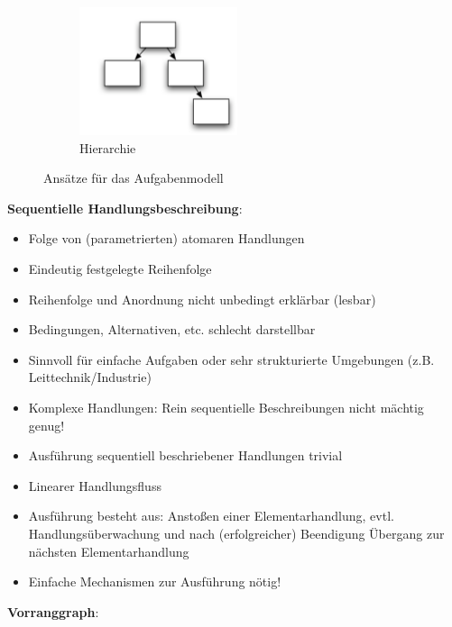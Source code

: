 \begin{figure}[h!]
\begin{subfigure}{.25\textwidth}
		\includegraphics[width=\textwidth]{figures/ch02_ans2.png}
		\caption{Hierarchie}
		\label{hier}
	\end{subfigure}
	\caption{Ansätze für das Aufgabenmodell}
	\label{ans}
\end{figure}
\textbf{Sequentielle Handlungsbeschreibung}:
\begin{itemize}
\item Folge von (parametrierten) atomaren Handlungen
\item Eindeutig festgelegte Reihenfolge
\item Reihenfolge und Anordnung nicht unbedingt erklärbar (lesbar)
\item Bedingungen, Alternativen, etc. schlecht darstellbar
\item Sinnvoll für einfache Aufgaben oder sehr strukturierte Umgebungen (z.B. Leittechnik/Industrie)
\item Komplexe Handlungen: Rein sequentielle Beschreibungen nicht mächtig genug!
\item Ausführung sequentiell beschriebener Handlungen trivial
\item Linearer Handlungsfluss
\item Ausführung besteht aus: Anstoßen einer Elementarhandlung, evtl. Handlungsüberwachung und nach (erfolgreicher) Beendigung Übergang zur nächsten Elementarhandlung
\item Einfache Mechanismen zur Ausführung nötig!
\end{itemize}
\textbf{Vorranggraph}:
